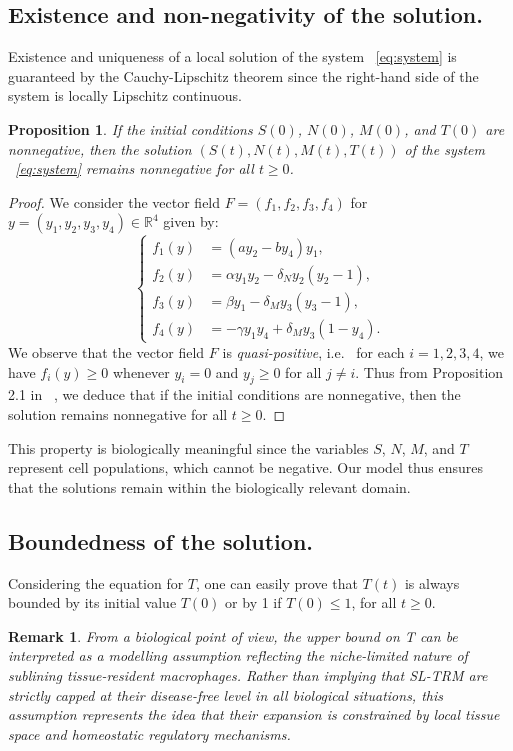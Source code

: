 \documentclass[a4paper, 12pt]{article}
\newtheorem{rem}{Remark}[section]
\newtheorem{proposition}{Proposition}[section]
\providecommand{\DIFaddtex}[1]{{\protect\color{blue} \sf #1}} %
\providecommand{\DIFaddbegin}{} %
\providecommand{\DIFaddend}{} %
\providecommand{\DIFadd}[1]{\texorpdfstring{\DIFaddtex{#1}}{#1}} %
\begin{document}
\subsection{Existence and non-negativity of the solution.}
Existence and uniqueness of a local solution of the system\DIFaddbegin \DIFadd{~}\DIFaddend \eqref{eq:system} is guaranteed by the Cauchy-Lipschitz theorem since the right-hand side of the system is locally Lipschitz continuous.
\begin{proposition}\DIFaddbegin \label{prop:positivity}
\DIFaddend If the initial conditions $S(0)$, $N(0)$, $M(0)$, and $T(0)$ are nonnegative, then the solution $(S(t), N(t), M(t), T(t))$ of the system\DIFaddbegin \DIFadd{~}\DIFaddend \eqref{eq:system} remains nonnegative for all $t \geq 0$.   
\end{proposition}
\begin{proof}
We consider the vector field $F=(f_1, f_2, f_3, f_4)$ for $y=(y_1, y_2, y_3, y_4)\in \mathbb{R}^4$ given by:
\begin{equation*}
  \left\{
\begin{aligned}
f_1(y) &= (a y_2 - b y_4) y_1, \\
f_2(y) &= \alpha y_1 y_2 - \delta_N y_2 (y_2 - 1), \\
f_3(y) &= \beta y_1 - \delta_M y_3 (y_3 - 1), \\
f_4(y) &= -\gamma y_1 y_4 + \delta_M y_3 (1 - y_4).
\end{aligned}
\right.
\end{equation*}
We observe that the vector field $F$ is \emph{quasi-positive}, i.e.\DIFaddbegin \DIFadd{\ }\DIFaddend for each $i=1,2,3,4$, we have $f_i(y) \geq 0$ whenever $y_i = 0$ and $y_j \geq 0$ for all $j \neq i$. Thus from Proposition 2.1 in\DIFaddbegin \DIFadd{~}\DIFaddend \cite{haraux2016}, we deduce that if the initial conditions are nonnegative, then the solution remains nonnegative for all $t \geq 0$.
\end{proof}
This property is biologically meaningful since the variables $S$, $N$, $M$, and $T$ represent cell populations, which cannot be negative. Our model thus ensures that the solutions remain within the biologically relevant domain.       
\subsection{Boundedness of the solution.}
Considering the equation for $T$, one can easily prove that $T(t)$  is always bounded by its initial value $T(0)$ or by 1 if $T(0) \leq 1$, for all $t \geq 0$. 
\begin{rem}%
From a biological point of view, the upper bound on T can be interpreted as a modelling assumption reflecting the niche-limited nature of sublining tissue-resident macrophages. Rather than implying that SL-TRM are strictly capped at their disease-free level in all biological situations, this assumption represents the idea that their expansion is constrained by local tissue space and homeostatic regulatory mechanisms.
\end{rem}
\end{document}
